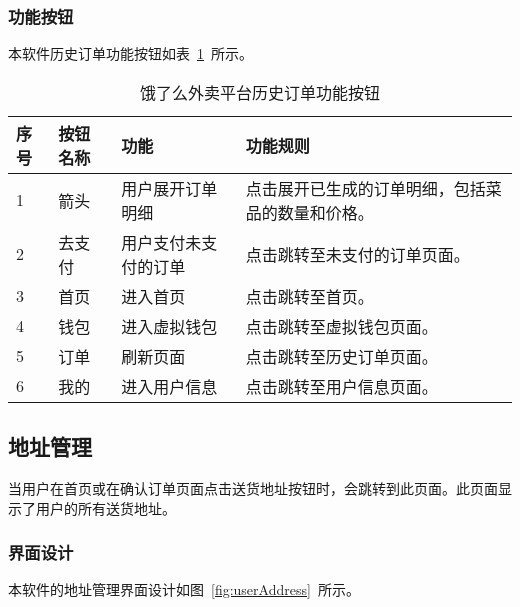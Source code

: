 \subsubsection{功能按钮}
本软件历史订单功能按钮如表~\ref{tab:table12}~所示。
\begin{table}[htbp]
    \caption{饿了么外卖平台历史订单功能按钮}\label{tab:table12}
    \vspace{0.5em}\wuhao
    \begin{tabularx}{\textwidth}{lllX}
    \toprule[1.5pt]
    序号 & 按钮名称 & 功能 & 功能规则 \\ 
    \midrule[1pt]
    1 & 箭头 & 用户展开订单明细 & 点击展开已生成的订单明细，包括菜品的数量和价格。 \\
    2 & 去支付 & 用户支付未支付的订单 & 点击跳转至未支付的订单页面。 \\
    3 & 首页 & 进入首页 & 点击跳转至首页。 \\
    4 & 钱包 & 进入虚拟钱包 & 点击跳转至虚拟钱包页面。 \\
    5 & 订单 & 刷新页面 & 点击跳转至历史订单页面。 \\
    6 & 我的 & 进入用户信息 & 点击跳转至用户信息页面。 \\
\bottomrule[1.5pt]
\end{tabularx}
\vspace{\baselineskip}
\end{table}

\subsection{地址管理}
当用户在首页或在确认订单页面点击送货地址按钮时，会跳转到此页面。此页面显示了用户的所有送货地址。
\subsubsection{界面设计}
本软件的地址管理界面设计如图~\ref{fig:userAddress}~所示。
